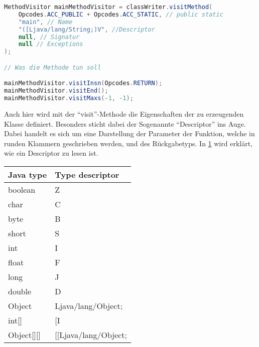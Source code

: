 \begin{lstlisting}[language=Java, caption=Definieren einer Methode, label={lst:asm-mainMethod}]
MethodVisitor mainMethodVisitor = classWriter.visitMethod(
	Opcodes.ACC_PUBLIC + Opcodes.ACC_STATIC, // public static
	"main", // Name
	"([Ljava/lang/String;)V", //Descriptor
	null, // Signatur
	null // Exceptions
);

// Was die Methode tun soll

mainMethodVisitor.visitInsn(Opcodes.RETURN);
mainMethodVisitor.visitEnd();
mainMethodVisitor.visitMaxs(-1, -1);

\end{lstlisting}

Auch hier wird mit der \enquote{visit}-Methode die Eigenschaften der zu erzeugenden Klasse definiert. Besonders sticht dabei der Sogenannte \enquote{Descriptor} ins Auge. Dabei handelt es sich um eine Darstellung der Parameter der Funktion, welche in runden Klammern geschrieben werden, und des Rückgabetyps. In \cref{tab:asm-descriptor} wird erklärt, wie ein Descriptor zu lesen ist.

\begin{table}[h!]
	\centering
		\begin{tabular}{@{}ll@{}}
			\toprule
			Java type          & Type descriptor          \\ \midrule
			boolean            & Z                        \\
			char               & C                        \\
			byte               & B                        \\
			short              & S                        \\
			int                & I                        \\
			float              & F                        \\
			long               & J                        \\
			double             & D                        \\
			Object             & Ljava/lang/Object;       \\
			int{[}{]}          & {[}I                     \\
			Object{[}{]}{[}{]} & {[}{[}Ljava/lang/Object; \\ \bottomrule
		\end{tabular}%
	\label{tab:asm-descriptor}
\end{table}

